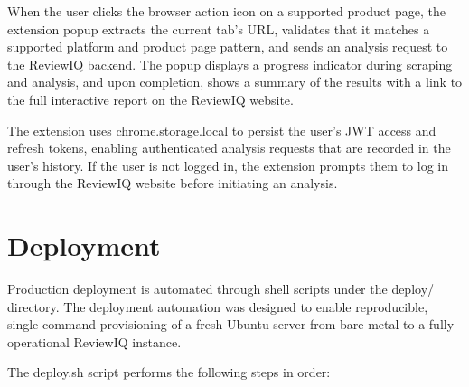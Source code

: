 \documentclass[12pt,a4paper,oneside]{report}
\renewcommand{\texttt}[1]{%
  {\ttfamily\hyphenchar\font=45\relax #1}}
\begin{document}
When the user clicks the browser action icon on a supported product page,
the extension popup extracts the current tab's URL, validates that it
matches a supported platform and product page pattern, and sends an
analysis request to the ReviewIQ backend. The popup displays a progress
indicator during scraping and analysis, and upon completion, shows a
summary of the results with a link to the full interactive report on the
ReviewIQ website.

The extension uses \texttt{chrome.storage.local} to persist the user's
JWT access and refresh tokens, enabling authenticated analysis requests
that are recorded in the user's history. If the user is not logged in,
the extension prompts them to log in through the ReviewIQ website before
initiating an analysis.

\section{Deployment}
Production deployment is automated through shell scripts under the
\texttt{deploy/} directory. The deployment automation was designed to
enable reproducible, single-command provisioning of a fresh Ubuntu
server from bare metal to a fully operational ReviewIQ instance.

The \texttt{deploy.sh} script performs the following steps in order:
\end{document}
